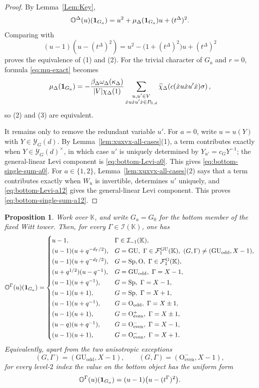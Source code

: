 \documentclass[12pt]{amsart}
\numberwithin{itemcounter}{subsection}
\theoremstyle{plain}
\newtheorem{proposition}[theorem]{Proposition}
\theoremstyle{definition}
\theoremstyle{remark}
\numberwithin{equation}{section}
\def\bbK{\mathbb{K}}
\def\bbO{\mathbb{O}}
\def\calF{\mathcal{F}}
\def\calI{\mathcal{I}}
\def\O{\mathrm{O}}
\def\Sp{\mathrm{Sp}}
\def\GU{\mathrm{GU}}
\begin{document}
\begin{proof}
By Lemma~\ref{Lem:Key},
\[
\bbO^\Delta(u)({\bf1}_{G_a})
=u^2+\mu_\Delta({\bf1}_{G_a})u+(t^\Delta)^2.
\]
Comparing with
\[
(u-1)(u-(t^\Delta)^2)
=u^2-\bigl(1+(t^\Delta)^2\bigr)u+(t^\Delta)^2
\]
proves the equivalence of (1) and (2).  For the trivial character of
$G_a$ and $r=0$, formula \eqref{eq:mu-exact} becomes
\[
\mu_\Delta({\bf1}_{G_a})
=-\frac{\beta_\Delta\omega_\Delta(\kappa_\Delta)}{|V|\chi_\Delta(1)}
\sum_{\substack{u,u'\in V\\
\dot{x}u\dot{x}u'\dot{x}\in P_{0,d}}}
\widetilde\chi_\Delta\!\left(
 c(\dot{x}u\dot{x}u'\dot{x})\sigma\right),
\]
so (2) and (3) are equivalent.

It remains only to remove the redundant variable $u'$.  For $a=0$,
write $u=u(Y)$ with $Y\in\mathscr Y_G(d)$.  By
Lemma~\ref{lem:xuxvx-all-cases}(1), a term contributes exactly when
$Y\in\mathscr Y_G(d)^\times$, in which case $u'$ is uniquely determined by
$Y_{u'}=c_GY^{-1}$; the general-linear Levi component is
\eqref{eq:bottom-Levi-a0}.  This gives
\eqref{eq:bottom-single-sum-a0}.  For $a\in\{1,2\}$,
Lemma~\ref{lem:xuxvx-all-cases}(2) says that a term contributes exactly
when $W_u$ is invertible, determines $u'$ uniquely, and
\eqref{eq:bottom-Levi-a12} gives the general-linear Levi component.
This proves \eqref{eq:bottom-single-sum-a12}.
\end{proof}

\begin{proposition}
\label{prop:all-bottom-bubbles}
Work over $\bbK$, and write $G_a=G_0$ for the bottom member of the fixed
Witt tower.  Then, for every $\Gamma\in\calI(\bbK)$, one has
\[
\bbO^\Gamma(u)({\bf1}_{G_a})=
\begin{cases}
 u-1,
   &\Gamma\in\calI_{-1}(\bbK),\\[2pt]
 (u-1)(u+q^{-d_\Gamma/2}),
   &G=\GU,\ \Gamma\in\calF_1^{\GU}(\bbK),\
    (G,\Gamma)\neq(\GU_{\mathrm{odd}},X-1),\\[2pt]
 (u-1)(u+q^{-d_\Gamma/2}),
   &G=\Sp,\O,\ \Gamma\in\calF_1^{\rm G}(\bbK),\\[2pt]
 (u+q^{1/2})(u-q^{-1}),
   &G=\GU_{\mathrm{odd}},\ \Gamma=X-1,\\[2pt]
 (u-1)(u+q^{-1}),
   &G=\Sp,\ \Gamma=X-1,\\[2pt]
 (u-1)(u+1),
   &G=\Sp,\ \Gamma=X+1,\\[2pt]
 (u-1)(u+q^{-1}),
   &G=\O_{\mathrm{odd}},\ \Gamma=X\pm1,\\[2pt]
 (u-1)(u+1),
   &G=\O^+_{\mathrm{even}},\ \Gamma=X\pm1,\\[2pt]
 (u-q)(u+q^{-1}),
   &G=\O^-_{\mathrm{even}},\ \Gamma=X-1,\\[2pt]
 (u-1)(u+1),
   &G=\O^-_{\mathrm{even}},\ \Gamma=X+1.
\end{cases}
\]
Equivalently, apart from the two anisotropic exceptions
\[
 (G,\Gamma)=(\GU_{\mathrm{odd}},X-1),\qquad
 (G,\Gamma)=(\O^-_{\mathrm{even}},X-1),
\]
for every level-$2$ index the value on the bottom object has the uniform form
\[
 \bbO^\Gamma(u)({\bf1}_{G_a})
 =(u-1)\bigl(u-(t^\Gamma)^2\bigr).
\]
\end{proposition}
\end{document}
